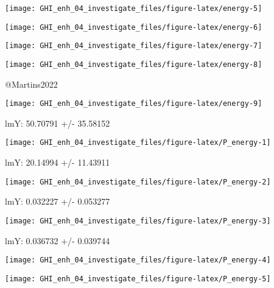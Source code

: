 \documentclass[
  10pt,
  a4paper,oneside]{article}
\begin{document}
\begin{center}\texttt{[image: GHI\_enh\_04\_investigate\_files/figure-latex/energy-5]} \end{center}

\begin{center}\texttt{[image: GHI\_enh\_04\_investigate\_files/figure-latex/energy-6]} \end{center}

\begin{center}\texttt{[image: GHI\_enh\_04\_investigate\_files/figure-latex/energy-7]} \end{center}

\begin{center}\texttt{[image: GHI\_enh\_04\_investigate\_files/figure-latex/energy-8]} \end{center}

@Martins2022

\begin{center}\texttt{[image: GHI\_enh\_04\_investigate\_files/figure-latex/energy-9]} \end{center}

lmY: 50.70791 +/- 35.58152

\begin{center}\texttt{[image: GHI\_enh\_04\_investigate\_files/figure-latex/P\_energy-1]} \end{center}

lmY: 20.14994 +/- 11.43911

\begin{center}\texttt{[image: GHI\_enh\_04\_investigate\_files/figure-latex/P\_energy-2]} \end{center}

lmY: 0.032227 +/- 0.053277

\begin{center}\texttt{[image: GHI\_enh\_04\_investigate\_files/figure-latex/P\_energy-3]} \end{center}

lmY: 0.036732 +/- 0.039744

\begin{center}\texttt{[image: GHI\_enh\_04\_investigate\_files/figure-latex/P\_energy-4]} \end{center}

\begin{center}\texttt{[image: GHI\_enh\_04\_investigate\_files/figure-latex/P\_energy-5]} \end{center}
\end{document}
